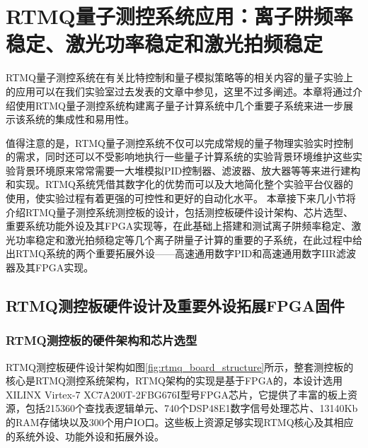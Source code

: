 

\chapter[RTMQ测控系统应用：离子阱频率稳定、激光功率稳定和激光拍频稳定]{RTMQ量子测控系统应用：离子阱频率稳定、激光功率稳定和激光拍频稳定\label{section:implementation}}

RTMQ量子测控系统在有关比特控制和量子模拟策略等的相关内容的量子实验上的应用可以在我们实验室过去发表的文章\cite[]{Zhang_Wang_Wang_Zhang_Wu_Jie_Lu_2022}中参见，这里不过多阐述。本章将通过介绍使用RTMQ量子测控系统构建离子量子计算系统中几个重要子系统来进一步展示该系统的集成性和易用性。


值得注意的是，RTMQ量子测控系统不仅可以完成常规的量子物理实验实时控制的需求，同时还可以不受影响地执行一些量子计算系统的实验背景环境维护这些实验背景环境原来常常需要一大堆模拟PID控制器、滤波器、放大器等等来进行建构和实现。RTMQ系统凭借其数字化的优势而可以及大地简化整个实验平台仪器的使用，使实验过程有着更强的可控性和更好的自动化水平。
本章接下来几小节将介绍RTMQ量子测控系统测控板的设计，包括测控板硬件设计架构、芯片选型、重要系统功能外设及其FPGA实现等，在此基础上搭建和测试离子阱频率稳定、激光功率稳定和激光拍频稳定等几个离子阱量子计算的重要的子系统，在此过程中给出RTMQ系统的两个重要拓展外设——高速通用数字PID和高速通用数字IIR滤波器及其FPGA实现。


\section[RTMQ测控板硬件设计及重要外设拓展FPGA固件]{RTMQ测控板硬件设计及重要外设拓展FPGA固件}

\subsection[RTMQ测控板的硬件架构和芯片选型]{RTMQ测控板的硬件架构和芯片选型}

RTMQ测控板硬件设计架构如图\ref{fig:rtmq_board_structure}所示，整套测控板的核心是RTMQ测控系统架构，RTMQ架构的实现是基于FPGA的，本设计选用XILINX Virtex-7 XC7A200T-2FBG676I\cite[]{7_Series_FPGAs_2020}型号FPGA芯片，它提供了丰富的板上资源，包括215360个查找表逻辑单元、740个DSP48E1数字信号处理芯片、13140Kb的RAM存储块以及300个用户IO口。这些板上资源足够实现RTMQ核心及其相应的系统外设、功能外设和拓展外设。

